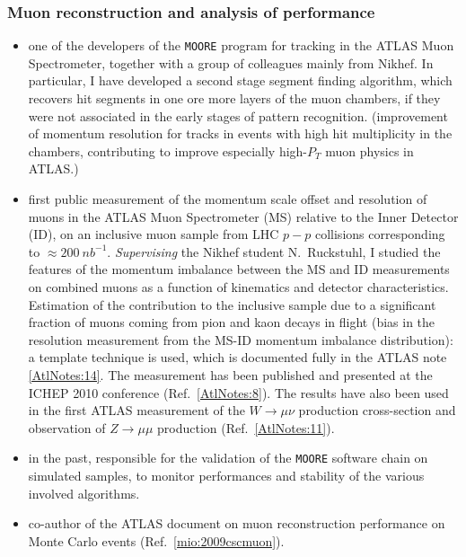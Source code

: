 \documentclass{article}
\begin{document}
\begin{vita}
\subsubsection*{Muon reconstruction and analysis of performance}
\begin{itemize}
\item one of the developers of the {\tt MOORE} program for tracking in the ATLAS Muon Spectrometer, together with a group of colleagues
 mainly from Nikhef. In particular, I have developed a second stage segment finding algorithm, 
which recovers hit segments in one ore more layers of the muon chambers, if they were not associated in the early stages of pattern recognition.
(improvement of momentum resolution for tracks in events with high hit multiplicity in the 
chambers, contributing to improve especially high-$P_{T}$ muon physics in ATLAS.) \\
\item first public measurement of the momentum scale offset and resolution of muons in the ATLAS Muon Spectrometer (MS) relative to the Inner Detector (ID),
on an inclusive muon sample from LHC $p-p$ collisions corresponding to 
$\approx 200~nb^{-1}$. {\it Supervising} the Nikhef student N.~Ruckstuhl, I studied the features of 
the momentum imbalance between the MS and ID measurements on combined muons as a function of kinematics and 
detector characteristics. Estimation of the contribution to the inclusive sample due
to a significant fraction of muons coming from pion and kaon decays in flight (bias in the resolution measurement from the MS-ID momentum imbalance distribution):  a template technique is used, which is documented fully in the ATLAS note \ref{AtlNotes:14}. 
The measurement has been published and presented at the ICHEP 2010 conference (Ref.~\ref{AtlNotes:8}). The results have also been used 
in the first ATLAS measurement of the $W \rightarrow \mu\nu$ production cross-section and observation of $Z \rightarrow \mu\mu$ production (Ref.~\ref{AtlNotes:11}). \\
\item in the past, responsible for the validation of the {\tt MOORE}  software chain on simulated samples, 
to monitor performances and stability of the various involved algorithms.
\item co-author of the ATLAS document on muon reconstruction performance
 on Monte Carlo events (Ref.~\ref{mio:2009cscmuon}).\\
\end{itemize}


\end{vita}
\end{document}
